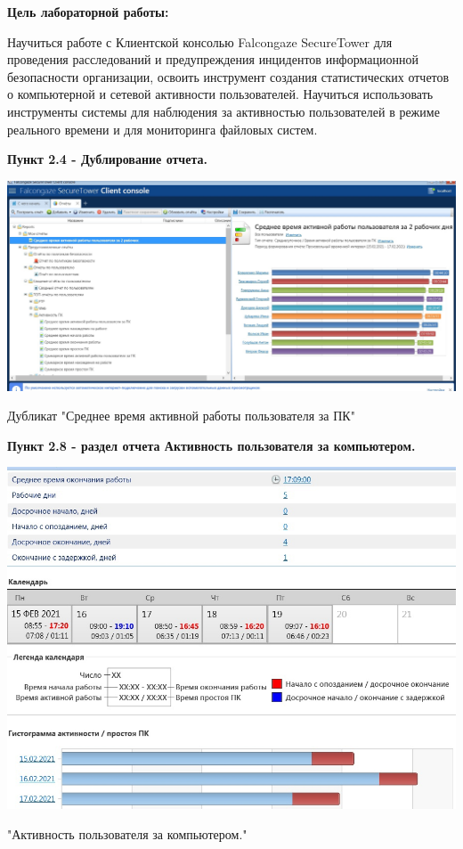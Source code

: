 \documentclass[a4paper,14pt]{extarticle}
\begin{document}
    \textbf{Цель лабораторной работы:}

    Научиться работе с Клиентской консолью Falcongaze SecureTower для проведения расследований и предупреждения инцидентов
    информационной безопасности организации, освоить инструмент создания статистических отчетов о компьютерной и сетевой активности 
    пользователей. Научиться использовать инструменты системы для наблюдения за активностью пользователей в режиме реального времени 
    и для мониторинга файловых систем.

    \textbf{Пункт 2.4 - Дублирование отчета.} 
    \begin{center}
        \includegraphics[scale=0.25]{pics/2.4.jpg}

        Дубликат "Среднее время активной работы пользователя за ПК"
    \end{center}

    \textbf{Пункт 2.8 - раздел отчета Активность пользователя за компьютером.} 
    \begin{center}
        \includegraphics[scale=0.3]{pics/2.8.jpg}
        
        "Активность пользователя за компьютером."
    \end{center}
\end{document}

